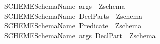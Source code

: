 \begin{isabellebody}
\ \ {\isachardoublequoteopen}{\isacharunderscore}SCHEME{}{\isachardoublequoteclose}{\isacharcolon}{\isacharcolon}{\isachardoublequoteopen}{\isacharbrackleft}SchemaName{\isacharcomma}\ args{\isacharbrackright}\ {\isacharequal}{\isachargreater}\ Zschema{\isachardoublequoteclose}\ \ \ \ \ \ \ \ \ \ \ \ \ {\isacharparenleft}{\isachardoublequoteopen}{\isacharplus}{\isacharminus}{\isacharminus}\ {\isacharunderscore}\ {\isacharbrackleft}{\isacharunderscore}{\isacharbrackright}\ {\isacharminus}{\isacharminus}{\isacharminus}{\isacharslash}{\isacharslash}{\isacharminus}{\isacharminus}{\isacharminus}{\isachardoublequoteclose}{\isacharparenright}\ \isanewline
\ \ {\isachardoublequoteopen}{\isacharunderscore}SCHEME{}{\isachardoublequoteclose}{\isacharcolon}{\isacharcolon}{\isachardoublequoteopen}{\isacharbrackleft}SchemaName{\isacharcomma}\ DeclParts{\isacharbrackright}\ {\isacharequal}{\isachargreater}\ Zschema{\isachardoublequoteclose}\ \ \ \ \ \ \ \ {\isacharparenleft}{\isachardoublequoteopen}{\isacharplus}{\isacharminus}{\isacharminus}\ {\isacharunderscore}\ {\isacharminus}{\isacharminus}{\isacharminus}{\isacharslash}{\isacharslash}{\isacharparenleft}{}\ {\isacharunderscore}{\isacharparenright}{\isacharslash}{\isacharslash}{\isacharminus}{\isacharminus}{\isacharminus}{\isachardoublequoteclose}{\isacharparenright}\isanewline
\ \ {\isachardoublequoteopen}{\isacharunderscore}SCHEME{}{\isachardoublequoteclose}{\isacharcolon}{\isacharcolon}{\isachardoublequoteopen}{\isacharbrackleft}SchemaName{\isacharcomma}\ Predicate{\isacharbrackright}\ {\isacharequal}{\isachargreater}\ Zschema\ {\isachardoublequoteclose}\ \ \ \ \ \ \ {\isacharparenleft}{\isachardoublequoteopen}{\isacharplus}{\isacharminus}{\isacharminus}\ {\isacharunderscore}\ {\isacharminus}{\isacharminus}{\isacharminus}{\isacharslash}{\isacharslash}{\isacharbar}{\isacharminus}{\isacharminus}{\isacharslash}{\isacharslash}{\isacharparenleft}{}\ {\isacharunderscore}{\isacharparenright}{\isacharslash}{\isacharslash}{\isacharminus}{\isacharminus}{\isacharminus}{\isachardoublequoteclose}\ {\isacharparenright}\isanewline
\ \ {\isachardoublequoteopen}{\isacharunderscore}SCHEME{}{\isachardoublequoteclose}{\isacharcolon}{\isacharcolon}{\isachardoublequoteopen}{\isacharbrackleft}SchemaName{\isacharcomma}\ args{\isacharcomma}\ DeclPart{\isacharbrackright}\ {\isacharequal}{\isachargreater}\ Zschema{\isachardoublequoteclose}\ \ \ {\isacharparenleft}{\isachardoublequoteopen}{\isacharplus}{\isacharminus}{\isacharminus}\ {\isacharunderscore}\ {\isacharbrackleft}{\isacharunderscore}{\isacharbrackright}\ {\isacharminus}{\isacharminus}{\isacharminus}{\isacharslash}{\isacharslash}{\isacharparenleft}{}\ {\isacharunderscore}{\isacharparenright}{\isacharslash}{\isacharslash}{\isacharminus}{\isacharminus}{\isacharminus}{\isachardoublequoteclose}{\isacharparenright}\isanewline

\end{isabellebody}
